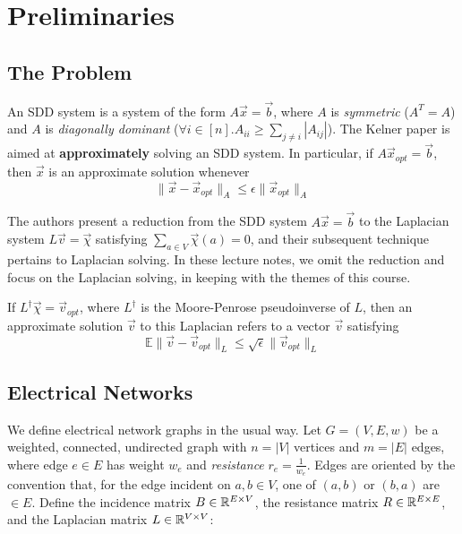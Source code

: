 \section{Preliminaries}\label{sec:prelim}
\subsection{The Problem}
An SDD system is a system of the form $A\vec x = \vec b$, where $A$ is \textit{symmetric} ($A^T = A$) and $A$ is \textit{diagonally dominant} ($\forall i\in[n].A_{ii}\ge\sum_{j\ne i}^{ }|A_{ij}|$). The Kelner paper \cite{Kel13} is aimed at \textbf{approximately} solving an SDD system. In particular, if $A\vec x_{opt} = \vec b$, then $\vec x$ is an approximate solution whenever $$ \|\vec{x} - \vec{x}_{opt}\|_A \le \epsilon \|\vec{x}_{opt}\|_A$$ 

The authors present a reduction from the SDD system $A \vec x = \vec b$ to the Laplacian system $L \vec v = \vec \chi$ satisfying $\sum_ {a \in V} \vec \chi(a)  = 0$, and their subsequent technique pertains to Laplacian solving. In these lecture notes, we omit the reduction and focus on the Laplacian solving, in keeping with the themes of this course. 

If $L^{\dagger} \vec \chi = \vec v _{opt}$, where $L^{\dagger}$ is the Moore-Penrose pseudoinverse of $L$, then an approximate solution $\vec v$ to this Laplacian refers to a vector $\vec v$ satisfying $$\mathbb E\| \vec v - \vec v_{opt}  \|_L \le \sqrt{\epsilon} \| \vec v_{opt} \|_L $$

\subsection{Electrical Networks}

We define electrical network graphs in the usual way. Let $G = (V,E,w)$ be a weighted, connected, undirected graph with $n = |V|$ vertices and $m = |E|$ edges, where edge $e \in E$ has weight $w_e$ and \textit{resistance} $r_e = \frac{1}{w_e}$. Edges  are oriented by the convention that, for the edge incident on $a,b\in V$, one of $(a,b)$ or $(b,a)$ are $\in E$.
Define the incidence matrix $B \in \mathbb R^{E \times V}$, the resistance matrix $R \in \mathbb R^{E \times E}$, and the Laplacian matrix $L \in \mathbb R^{V \times V}$: 
\\ 

